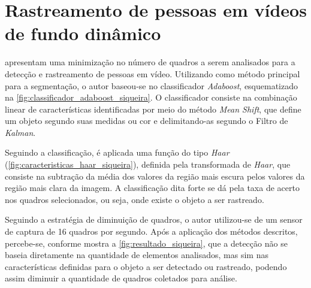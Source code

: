 \documentclass[12pt,oneside,a4paper,chapter=TITLE,section=TITLE,sumario=tradicional]{abntex2}
\begin{document}
\section{Rastreamento de pessoas em vídeos de fundo dinâmico}

 apresentam uma minimização no número de quadros a serem analisados para a detecção e rastreamento de pessoas em vídeo. Utilizando como método principal para a segmentação, o autor baseou-se no classificador \textit{Adaboost}, esquematizado na \autoref{fig:classificador_adaboost_siqueira}. O classificador consiste na combinação linear de características identificadas por meio do método \textit{Mean Shift}, que define um objeto segundo suas medidas ou cor e delimitando-as segundo o Filtro de \textit{Kalman}.

\begin{figure}[htb]
\end{figure}

\newpage

Seguindo a classificação, é aplicada uma função do tipo \textit{Haar} (\autoref{fig:caracteristicas_haar_siqueira}), definida pela transformada de \textit{Haar}, que consiste na subtração da média dos valores da região mais escura pelos valores da região mais clara da imagem. A classificação dita forte se dá pela taxa de acerto nos quadros selecionados, ou seja, onde existe o objeto a ser rastreado.

\begin{figure}[htb]
\end{figure}

Seguindo a estratégia de diminuição de quadros, o autor utilizou-se de um sensor de captura de 16 quadros por segundo. Após a aplicação dos métodos descritos, percebe-se, conforme mostra a \autoref{fig:resultado_siqueira}, que a detecção não se baseia diretamente na quantidade de elementos analisados, mas sim nas características definidas para o objeto a ser detectado ou rastreado, podendo assim diminuir a quantidade de quadros coletados para análise.

\begin{figure}[htb]
\end{figure}
\newpage
\end{document}
